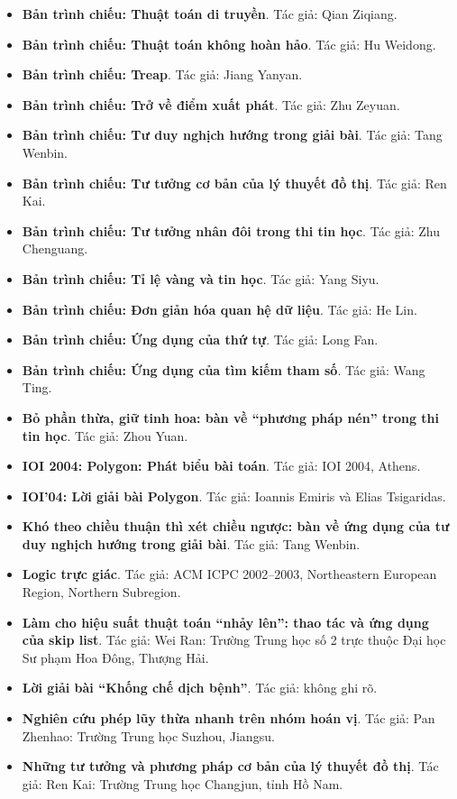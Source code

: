 \documentclass[11pt]{article}
\begin{document}
\begin{itemize}[leftmargin=2em]
  \item \textbf{Bản trình chiếu: Thuật toán di truyền}. Tác giả: Qian Ziqiang.
  \item \textbf{Bản trình chiếu: Thuật toán không hoàn hảo}. Tác giả: Hu Weidong.
  \item \textbf{Bản trình chiếu: Treap}. Tác giả: Jiang Yanyan.
  \item \textbf{Bản trình chiếu: Trở về điểm xuất phát}. Tác giả: Zhu Zeyuan.
  \item \textbf{Bản trình chiếu: Tư duy nghịch hướng trong giải bài}. Tác giả: Tang Wenbin.
  \item \textbf{Bản trình chiếu: Tư tưởng cơ bản của lý thuyết đồ thị}. Tác giả: Ren Kai.
  \item \textbf{Bản trình chiếu: Tư tưởng nhân đôi trong thi tin học}. Tác giả: Zhu Chenguang.
  \item \textbf{Bản trình chiếu: Tỉ lệ vàng và tin học}. Tác giả: Yang Siyu.
  \item \textbf{Bản trình chiếu: Đơn giản hóa quan hệ dữ liệu}. Tác giả: He Lin.
  \item \textbf{Bản trình chiếu: Ứng dụng của thứ tự}. Tác giả: Long Fan.
  \item \textbf{Bản trình chiếu: Ứng dụng của tìm kiếm tham số}. Tác giả: Wang Ting.
  \item \textbf{Bỏ phần thừa, giữ tinh hoa: bàn về ``phương pháp nén'' trong thi tin học}. Tác giả: Zhou Yuan.
  \item \textbf{IOI 2004: Polygon: Phát biểu bài toán}. Tác giả: IOI 2004, Athens.
  \item \textbf{IOI'04: Lời giải bài Polygon}. Tác giả: Ioannis Emiris và Elias Tsigaridas.
  \item \textbf{Khó theo chiều thuận thì xét chiều ngược: bàn về ứng dụng của tư duy nghịch hướng trong giải bài}. Tác giả: Tang Wenbin.
  \item \textbf{Logic trực giác}. Tác giả: ACM ICPC 2002--2003, Northeastern European Region, Northern Subregion.
  \item \textbf{Làm cho hiệu suất thuật toán ``nhảy lên'': thao tác và ứng dụng của skip list}. Tác giả: Wei Ran: Trường Trung học số 2 trực thuộc Đại học Sư phạm Hoa Đông, Thượng Hải.
  \item \textbf{Lời giải bài ``Khống chế dịch bệnh''}. Tác giả: không ghi rõ.
  \item \textbf{Nghiên cứu phép lũy thừa nhanh trên nhóm hoán vị}. Tác giả: Pan Zhenhao: Trường Trung học Suzhou, Jiangsu.
  \item \textbf{Những tư tưởng và phương pháp cơ bản của lý thuyết đồ thị}. Tác giả: Ren Kai: Trường Trung học Changjun, tỉnh Hồ Nam.

\end{itemize}
\end{document}
